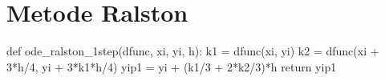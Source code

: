 \section{Metode Ralston}

\begin{pythoncode}
def ode_ralston_1step(dfunc, xi, yi, h):
    k1 = dfunc(xi, yi)
    k2 = dfunc(xi + 3*h/4, yi + 3*k1*h/4)
    yip1 = yi + (k1/3 + 2*k2/3)*h
    return yip1
\end{pythoncode}
